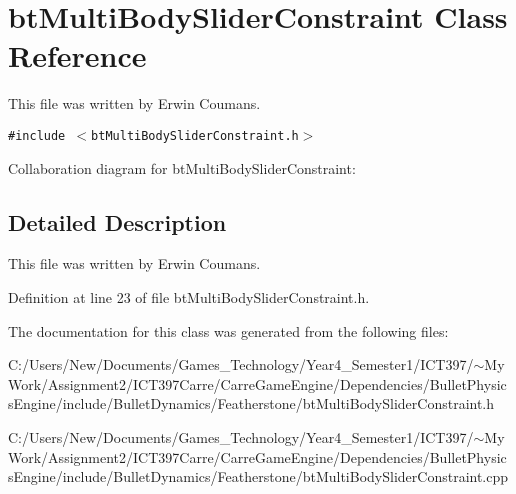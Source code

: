 \hypertarget{classbt_multi_body_slider_constraint}{
\section{btMultiBodySliderConstraint Class Reference}
\label{classbt_multi_body_slider_constraint}
}
This file was written by Erwin Coumans.  


{\tt \#include $<$btMultiBodySliderConstraint.h$>$}

Collaboration diagram for btMultiBodySliderConstraint:

\subsection{Detailed Description}
This file was written by Erwin Coumans. 

Definition at line 23 of file btMultiBodySliderConstraint.h.

The documentation for this class was generated from the following files:\begin{CompactItemize}
\item 
C:/Users/New/Documents/Games\_\-Technology/Year4\_\-Semester1/ICT397/$\sim$My Work/Assignment2/ICT397Carre/CarreGameEngine/Dependencies/BulletPhysicsEngine/include/BulletDynamics/Featherstone/btMultiBodySliderConstraint.h\item 
C:/Users/New/Documents/Games\_\-Technology/Year4\_\-Semester1/ICT397/$\sim$My Work/Assignment2/ICT397Carre/CarreGameEngine/Dependencies/BulletPhysicsEngine/include/BulletDynamics/Featherstone/btMultiBodySliderConstraint.cpp\end{CompactItemize}
